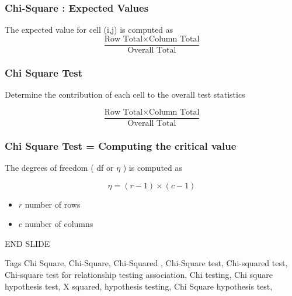 


\begin{frame}
\frametitle{Chi-Square : Expected Values}

The expected value for cell (i,j) is computed as
\[  \frac{\mbox{Row Total}\times \mbox{Column Total}}{\mbox{Overall Total}} \]




\end{frame}
\begin{frame}
\frametitle{Chi Square Test}
Determine the contribution of each cell to the overall test statistics


\[  \frac{\mbox{Row Total}\times \mbox{Column Total}}{\mbox{Overall Total}} \]

\end{frame}
\begin{frame}
\frametitle{Chi Square Test = Computing the critical value}
The degrees of freedom ( df or $\eta$ ) is computed as

\[ \eta = (r-1)\times(c-1) \]

\begin{itemize}
\item $r$ number of rows
\item $c$ number of columns
\end{itemize}
\end{frame}

\begin{frame}

END SLIDE


\end{frame}


Tags
Chi Square, Chi-Square, Chi-Squared , Chi-Square test, Chi-squared test, Chi-square test for relationship
testing association, Chi testing, Chi square hypothesis test, X squared, hypothesis testing,
Chi Square hypothesis test,
